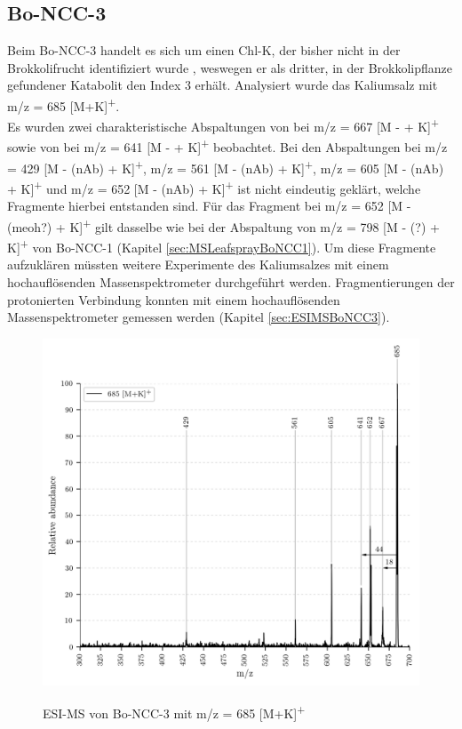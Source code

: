 \subsection{Bo-NCC-3}

Beim Bo-NCC-3 handelt es sich um einen \gls{Chl-K}, der bisher nicht in der Brokkolifrucht identifiziert wurde \cite{ChlorophyllCatabolitesBroccoli}, weswegen er als dritter, in der Brokkolipflanze gefundener Katabolit den Index 3 erhält. Analysiert wurde das Kaliumsalz mit m/z = 685 [M+K]\textsuperscript{+}. \\

Es wurden zwei charakteristische Abspaltungen von  bei m/z = 667 [M -  + K]\textsuperscript{+} sowie von  bei m/z = 641 [M -  + K]\textsuperscript{+} beobachtet. Bei den Abspaltungen bei m/z = 429 [M - (\gls{nAb}) + K]\textsuperscript{+}, m/z = 561 [M - (\gls{nAb}) + K]\textsuperscript{+}, m/z = 605 [M - (\gls{nAb}) + K]\textsuperscript{+} und m/z = 652 [M - (\gls{nAb}) + K]\textsuperscript{+} ist nicht eindeutig geklärt, welche Fragmente hierbei entstanden sind. Für das Fragment bei m/z = 652 [M - (\gls{meoh}?) + K]\textsuperscript{+} gilt dasselbe wie bei der Abspaltung von m/z = 798 [M - (?) + K]\textsuperscript{+} von Bo-NCC-1 (Kapitel \ref{sec:MSLeafsprayBoNCC1}). Um diese Fragmente aufzuklären müssten weitere Experimente des Kaliumsalzes mit einem hochauflösenden Massenspektrometer durchgeführt werden. Fragmentierungen der protonierten Verbindung konnten mit einem hochauflösenden Massenspektrometer gemessen werden (Kapitel \ref{sec:ESIMSBoNCC3}).

\begin{figure}[htbp]
  \includegraphics[width=\textwidth, height=0.7\textwidth]{figures/Kapitel4/Kataboliten/VWA_MS_LeafSpray_685.png}
  \label{fig:685MKLeafspray}
  
  \caption[ESI-MS von Bo-NCC-3, Quelle: Autor]{ESI-MS von Bo-NCC-3 mit m/z = 685 [M+K]\textsuperscript{+}}
\end{figure}

